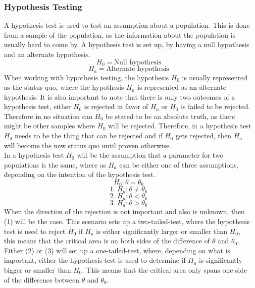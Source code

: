 \subsubsection{Hypothesis Testing}
A hypothesis test is used to test an assumption about a population. This is done from a sample of the population, as the information about the population is usually hard to come by. A hypothesis test is set up, by having a null hypothesis and an alternate hypothesis.
$$H_0 = \text{Null hypothesis}$$
$$H_a = \text{Alternate hypothesis}$$
When working with hypothesis testing, the hypothesis $H_0$ is usually represented as the status quo, where the hypothesis $H_a$ is represented as an alternate hypothesis. It is also important to note that there is only two outcomes of a hypothesis test, either $H_0$ is rejected in favor of $H_a$ or $H_0$ is failed to be rejected. Therefore in no situation can $H_0$ be stated to be an absolute truth, as there might be other samples where $H_0$ will be rejected. Therefore, in a hypothesis test $H_0$ needs to be the thing that can be rejected and if $H_0$ gets rejected, then $H_a$ will become the new status quo until proven otherwise.\\
In a hypothesis test $H_0$ will be the assumption that a parameter for two populations is the same, where as $H_a$ can be either one of three assumptions, depending on the intention of the hypothesis test.
$$H_0: \theta = \theta_0$$
$$1.\;H_a: \theta \neq \theta_0$$
$$2.\;H_a: \theta < \theta_0$$
$$3.\;H_a: \theta > \theta_0$$
When the direction of the rejection is not important and also is unknown, then (1) will be the case. This scenario sets up a two-tailed-test, where the hypothesis test is used to reject $H_0$ if $H_a$ is either significantly larger or smaller than $H_0$, this means that the critical area is on both sides of the difference of $\theta$ and $\theta_0$. Either (2) or (3) will set up a one-tailed-test, where, depending on what is important, either the hypothesis test is used to determine if $H_a$ is significantly bigger or smaller than $H_0$. This means that the critical area only spans one side of the difference between $\theta$ and $\theta_0$.\\


